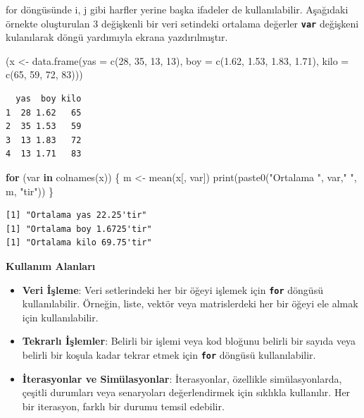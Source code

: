 \documentclass[
  letterpaper,
  DIV=11,
  numbers=noendperiod]{scrreprt}
\newenvironment{Shaded}{\begin{snugshade}}{\end{snugshade}}
\newcommand{\AttributeTok}[1]{\textcolor[rgb]{0.40,0.45,0.13}{#1}}
\newcommand{\ControlFlowTok}[1]{\textcolor[rgb]{0.00,0.23,0.31}{\textbf{#1}}}
\newcommand{\DecValTok}[1]{\textcolor[rgb]{0.68,0.00,0.00}{#1}}
\newcommand{\FloatTok}[1]{\textcolor[rgb]{0.68,0.00,0.00}{#1}}
\newcommand{\FunctionTok}[1]{\textcolor[rgb]{0.28,0.35,0.67}{#1}}
\newcommand{\NormalTok}[1]{\textcolor[rgb]{0.00,0.23,0.31}{#1}}
\newcommand{\OtherTok}[1]{\textcolor[rgb]{0.00,0.23,0.31}{#1}}
\newcommand{\StringTok}[1]{\textcolor[rgb]{0.13,0.47,0.30}{#1}}
\begin{document}
for döngüsünde i, j gibi harfler yerine başka ifadeler de
kullanılabilir. Aşağıdaki örnekte oluşturulan 3 değişkenli bir veri
setindeki ortalama değerler \textbf{\texttt{var}} değişkeni kulanılarak
döngü yardımıyla ekrana yazdırılmıştır.

\begin{Shaded}
\begin{Highlighting}[]
\NormalTok{(x }\OtherTok{\textless{}{-}} \FunctionTok{data.frame}\NormalTok{(}\AttributeTok{yas =} \FunctionTok{c}\NormalTok{(}\DecValTok{28}\NormalTok{, }\DecValTok{35}\NormalTok{, }\DecValTok{13}\NormalTok{, }\DecValTok{13}\NormalTok{),}
                \AttributeTok{boy =} \FunctionTok{c}\NormalTok{(}\FloatTok{1.62}\NormalTok{, }\FloatTok{1.53}\NormalTok{, }\FloatTok{1.83}\NormalTok{, }\FloatTok{1.71}\NormalTok{),}
                \AttributeTok{kilo =} \FunctionTok{c}\NormalTok{(}\DecValTok{65}\NormalTok{, }\DecValTok{59}\NormalTok{, }\DecValTok{72}\NormalTok{, }\DecValTok{83}\NormalTok{)))}
\end{Highlighting}
\end{Shaded}

\begin{verbatim}
  yas  boy kilo
1  28 1.62   65
2  35 1.53   59
3  13 1.83   72
4  13 1.71   83
\end{verbatim}

\begin{Shaded}
\begin{Highlighting}[]
\ControlFlowTok{for}\NormalTok{ (var }\ControlFlowTok{in} \FunctionTok{colnames}\NormalTok{(x)) \{}
\NormalTok{    m }\OtherTok{\textless{}{-}} \FunctionTok{mean}\NormalTok{(x[, var])}
    \FunctionTok{print}\NormalTok{(}\FunctionTok{paste0}\NormalTok{(}\StringTok{"Ortalama "}\NormalTok{, var,}\StringTok{" "}\NormalTok{, m, }\StringTok{"\textquotesingle{}tir"}\NormalTok{))}
\NormalTok{\}}
\end{Highlighting}
\end{Shaded}

\begin{verbatim}
[1] "Ortalama yas 22.25'tir"
[1] "Ortalama boy 1.6725'tir"
[1] "Ortalama kilo 69.75'tir"
\end{verbatim}

\textbf{Kullanım Alanları}

\begin{itemize}
\item
  \textbf{Veri İşleme}: Veri setlerindeki her bir öğeyi işlemek için
  \textbf{\texttt{for}} döngüsü kullanılabilir. Örneğin, liste, vektör
  veya matrislerdeki her bir öğeyi ele almak için kullanılabilir.
\item
  \textbf{Tekrarlı İşlemler}: Belirli bir işlemi veya kod bloğunu
  belirli bir sayıda veya belirli bir koşula kadar tekrar etmek için
  \textbf{\texttt{for}} döngüsü kullanılabilir.
\item
  \textbf{İterasyonlar ve Simülasyonlar}: İterasyonlar, özellikle
  simülasyonlarda, çeşitli durumları veya senaryoları değerlendirmek
  için sıklıkla kullanılır. Her bir iterasyon, farklı bir durumu temsil
  edebilir.
\end{itemize}
\end{document}
